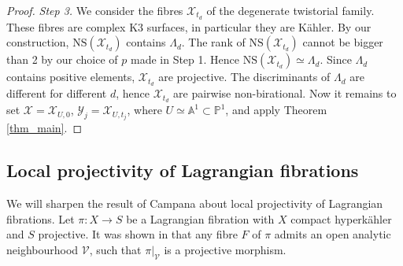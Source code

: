 \documentclass[10pt]{amsart}
\newcommand{\bbA}{\mathbb{A}}
\newcommand{\bbZ}{\mathbb{Z}}
\newcommand{\bbR}{\mathbb{R}}
\newcommand{\bbP}{\mathbb{P}}
\newcommand{\CC}{\mathcal{C}}
\newcommand{\VV}{\mathcal{V}}
\newcommand{\XX}{\mathcal{X}}
\newcommand{\YY}{\mathcal{Y}}
\newcommand{\st}{\enskip |\enskip}
\begin{document}
\begin{proof}

{\it Step 3.} We consider the fibres $\XX_{t_d}$ of the degenerate twistorial family.
These fibres are complex K3 surfaces, in particular they are K\"ahler.
By our construction, $\mathrm{NS}(\XX_{t_d})$ contains $\Lambda_d$. The rank of $\mathrm{NS}(\XX_{t_d})$ cannot be bigger than 2 by our choice of $p$
made in Step 1. Hence $\mathrm{NS}(\XX_{t_d}) \simeq \Lambda_d$.
Since $\Lambda_d$ contains positive elements, $\XX_{t_d}$ are projective.
The discriminants of $\Lambda_d$ are different for different $d$, hence $\XX_{t_d}$ are pairwise
non-birational. Now it remains to set $\XX = \XX_{U,0}$, $\YY_j = \XX_{U,t_j}$,
where $U \simeq \bbA^1\subset \bbP^1$, and apply
Theorem \ref{thm_main}.
\end{proof}

\subsection{Local projectivity of Lagrangian fibrations}

We will sharpen the result of Campana \cite{Ca} about local projectivity of
Lagrangian fibrations. Let $\pi\colon X\to S$ be a Lagrangian fibration
with $X$ compact hyperk\"ahler and $S$ projective. It was shown in \cite{Ca} that any fibre $F$
of $\pi$ admits an open analytic neighbourhood $\VV$, such that $\pi|_\VV$
is a projective morphism.
\end{document}
